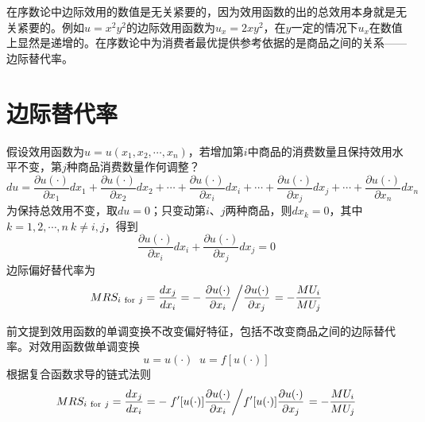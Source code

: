 在序数论中边际效用的数值是无关紧要的，因为效用函数的出的总效用本身就是无关紧要的。例如$u=x^2y^2$的边际效用函数为$u_x=2xy^2$，在$y$一定的情况下$u_x$在数值上显然是递增的。在序数论中为消费者最优提供参考依据的是商品之间的关系——边际替代率。

\section{边际替代率}
\label{sec:marginal-rate-of-substitution}
假设效用函数为$u=u(x_1,x_2,\cdots, x_n)$，若增加第$i$中商品的消费数量且保持效用水平不变，第$j$种商品消费数量作何调整？
\begin{equation}
du = \frac{{\partial u(\cdot)}}{{\partial {x_1}}}d{x_1} + \frac{{\partial u(\cdot)}}{{\partial {x_2}}}d{x_2} +  \cdots  + \frac{{\partial u(\cdot)}}{{\partial {x_i}}}d{x_i} +  \cdots  + \frac{{\partial u(\cdot)}}{{\partial {x_j}}}d{x_j} +  \cdots + \frac{{\partial u(\cdot)}}{{\partial {x_n}}}d{x_n}
\end{equation}
为保持总效用不变，取$du=0$；只变动第$i$、$j$两种商品，则$dx_k=0$，其中$k=1,2,\cdots,n ~ k \ne i,j$，得到
\begin{equation}
\frac{{\partial u(\cdot)}}{{\partial {x_i}}}d{x_i} + \frac{{\partial u(\cdot)}}{{\partial {x_j}}}d{x_j} = 0
\end{equation}
边际偏好替代率为
\begin{equation}
MRS_{{i}~\text{for}~{j}} = \frac{{d{x_j}}}{{d{x_i}}} =  - \left. {\frac{{\partial u(\cdot)}}{{\partial {x_i}}}} \middle/ {\frac{{\partial u(\cdot)}}{{\partial {x_j}}}} \right. = -\frac{MU_i}{MU_j}
\label{eq:marginal-rate-of-substitution}
\end{equation}

前文提到效用函数的单调变换不改变偏好特征，包括不改变商品之间的边际替代率。对效用函数做单调变换
\begin{equation}
u = u(\cdot)\mathop  {\xrightarrow{单调变换}} u = f[u(\cdot)]
\label{eq:xiaoyong-dandiaobianhuan}
\end{equation}
根据复合函数求导的链式法则
\begin{equation}
MRS_{{i}~\text{for}~{j}} = \frac{{d{x_j}}}{{d{x_i}}}	=  - \left. {f'[u(\cdot)]\frac{{\partial u(\cdot)}}{{\partial {x_i}}}} \middle/ {f'[u(\cdot)]\frac{{\partial u(\cdot)}}{{\partial {x_j}}}} \right. = -\frac{MU_i}{MU_j}
\label{eq:marginal-rate-of-substitution-monly}
\end{equation}

